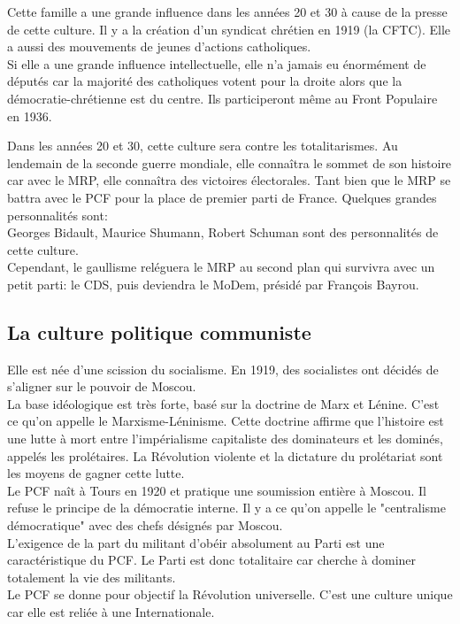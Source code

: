 \documentclass[12pt, a4paper, openany]{book}
\begin{document}
Cette famille a une grande influence dans les années 20 et 30 à cause de la presse de cette culture. Il y a la création d'un syndicat chrétien en 1919 (la CFTC). Elle a aussi des mouvements de jeunes d'actions catholiques. \\
Si elle a une grande influence intellectuelle, elle n'a jamais eu énormément de députés car la majorité des catholiques votent pour la droite alors que la démocratie-chrétienne est du centre. Ils participeront même au Front Populaire en 1936.


Dans les années 20 et 30, cette culture sera contre les totalitarismes. Au lendemain de la seconde guerre mondiale, elle connaîtra le sommet de son histoire car avec le MRP, elle connaîtra des victoires électorales. Tant bien que le MRP se battra avec le PCF pour la place de premier parti de France. Quelques grandes personnalités sont: \\
Georges Bidault, Maurice Shumann, Robert Schuman sont des personnalités de cette culture. \\
Cependant, le gaullisme reléguera le MRP au second plan qui survivra avec un petit parti: le CDS, puis deviendra le MoDem, présidé par François Bayrou. 

\subsection{La culture politique communiste}

Elle est née d'une scission du socialisme. En 1919, des socialistes ont décidés de s'aligner sur le pouvoir de Moscou. \\
La base idéologique est très forte, basé sur la doctrine de Marx et Lénine. C'est ce qu'on appelle le Marxisme-Léninisme. Cette doctrine affirme que l'histoire est une lutte à mort entre l'impérialisme capitaliste des dominateurs et les dominés, appelés les prolétaires. La Révolution violente et la dictature du prolétariat sont les moyens de gagner cette lutte. \\


Le PCF naît à Tours en 1920 et pratique une soumission entière à Moscou. Il refuse le principe de la démocratie interne. Il y a ce qu'on appelle le "centralisme démocratique" avec des chefs désignés par Moscou. \\
L'exigence de la part du militant d'obéir absolument au Parti est une caractéristique du PCF. Le Parti est donc totalitaire car cherche à dominer totalement la vie des militants. \\
Le PCF se donne pour objectif la Révolution universelle. C'est une culture unique car elle est reliée à une Internationale.
\end{document}
